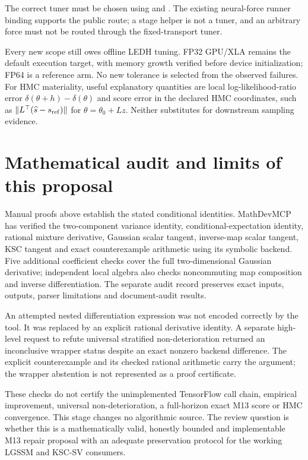 \documentclass[11pt]{article}
\begin{document}
The correct tuner must be chosen using
 and
.
The existing neural-force runner binding supports the public
 route; a stage helper is not a tuner, and an
arbitrary force must not be routed through the fixed-transport tuner.

Every new scope still owes offline LEDH tuning. FP32 GPU/XLA remains the
default execution target, with memory growth verified before device
initialization; FP64 is a reference arm. No new tolerance is selected from
the observed failures. For HMC materiality, useful explanatory quantities
are local log-likelihood-ratio error
$\delta(\theta+h)-\delta(\theta)$ and score error in the declared HMC
coordinates, such as $\|L^\top(\widehat s-s_{\rm ref})\|$ for
$\theta=\theta_0+Lz$. Neither substitutes for downstream sampling evidence.

\section{Mathematical audit and limits of this proposal}

Manual proofs above establish the stated conditional identities. MathDevMCP
has verified the two-component variance identity, conditional-expectation
identity, rational mixture derivative, Gaussian scalar tangent,
inverse-map scalar tangent, KSC tangent and exact counterexample arithmetic
using its symbolic backend. Five additional coefficient checks cover the
full two-dimensional Gaussian derivative; independent local algebra also
checks noncommuting map composition and inverse differentiation.
The separate audit record preserves exact
inputs, outputs, parser limitations and document-audit results.

An attempted nested differentiation expression was not encoded correctly by
the tool. It was replaced by an explicit rational derivative identity.
A separate high-level request to refute universal stratified
non-deterioration returned an inconclusive wrapper status despite an
exact nonzero backend difference. The explicit counterexample and its
checked rational arithmetic carry the argument; the wrapper abstention
is not represented as a proof certificate.

These checks do not certify the unimplemented TensorFlow call chain,
empirical improvement, universal non-deterioration, a full-horizon exact
M13 score or HMC convergence. This stage changes no algorithmic source.
The review question is whether this is a mathematically valid, honestly
bounded and implementable M13 repair proposal with an adequate preservation
protocol for the working LGSSM and KSC-SV consumers.
\end{document}
